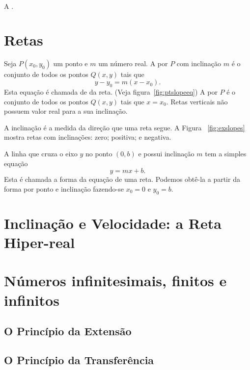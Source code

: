 \documentclass{svmono}
\begin{document}
\begin{example}\label{ex:funcrec}
A .
\end{example}

\section{Retas}
\label{sec:lines}

\begin{defin}
Seja $P(x_0,y_0)$ um ponto e $m$ um número real. A  por $P$
com inclinação $m$ é o conjunto de todos os pontos $Q(x,y)$ tais que
\[
  y - y_0 = m(x - x_0).
\]
Esta equação é chamada de  %
%
da reta.
(Veja figura~\ref{fig:ptslopeeq})
A  por $P$ é o conjunto de todos os
pontos $Q(x,y)$ tais que $x = x_0$. Retas verticais não possuem valor
real para a sua inclinação.
\end{defin}

A inclinação é a medida da direção que uma reta segue. A Figura%
~\ref{fig:exslopes} mostra retas com inclinações: zero; positiva;
e negativa.

A linha que cruza o eixo $y$ no ponto $(0,b)$ e possui inclinação $m$
tem a simples equação
\[
  y = mx + b.
\]
Esta é chamada a forma %
%
da equação de uma reta. Podemos obtê-la a partir da forma por
ponto e inclinação fazendo-se $x_0 = 0$ e $y_0 = b$.

\section{Inclinação e Velocidade: a Reta Hiper-real}
\label{sec:hyperrealline}

\section{Números infinitesimais, finitos e infinitos}
\label{sec:infnumbers}

\subsection{O Princípio da Extensão}
\label{sec:extprinciple}

\subsection{O Princípio da Transferência}
\label{sec:transferprinciple}
\end{document}
